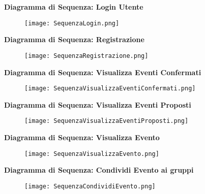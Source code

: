 \textbf{Diagramma di Sequenza: Login Utente}

\begin{figure}[h!]
    \begin{center}
        \texttt{[image: SequenzaLogin.png]}
    \end{center}
\end{figure}
\hfill \break

\textbf{Diagramma di Sequenza: Registrazione}

\begin{figure}[h!]
    \begin{center}
        \texttt{[image: SequenzaRegistrazione.png]}
    \end{center}
\end{figure}
\hfill \break
\newpage

\textbf{Diagramma di Sequenza: Visualizza Eventi Confermati}

\begin{figure}[h!]
    \begin{center}
        \texttt{[image: SequenzaVisualizzaEventiConfermati.png]}
    \end{center}
\end{figure}
\hfill \break

\textbf{Diagramma di Sequenza: Visualizza Eventi Proposti}

\begin{figure}[h!]
    \begin{center}
        \texttt{[image: SequenzaVisualizzaEventiProposti.png]}
    \end{center}
\end{figure}
\hfill \break
\newpage
\textbf{Diagramma di Sequenza: Visualizza Evento}

\begin{figure}[h!]
    \begin{center}
        \texttt{[image: SequenzaVisualizzaEvento.png]}
    \end{center}
\end{figure}
\hfill \break
\textbf{Diagramma di Sequenza: Condividi Evento ai gruppi}

\begin{figure}[h!]
    \begin{center}
        \texttt{[image: SequenzaCondividiEvento.png]}
    \end{center}
\end{figure}
\hfill \break
\clearpage

